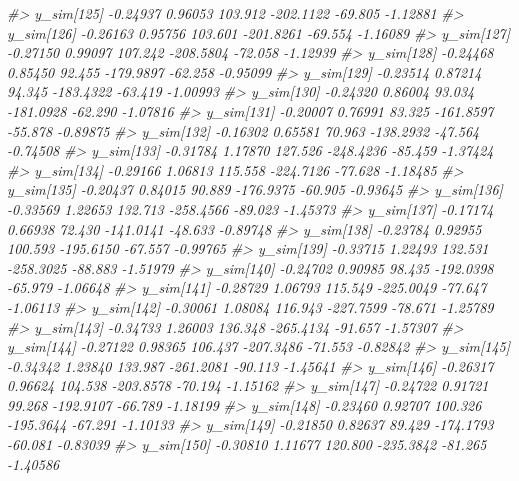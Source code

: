 \documentclass[
  10pt,
  italian,
  a4paper,
  extrafontsizes,onecolumn,openright
  ]{memoir}
\newenvironment{Shaded}{\begin{snugshade}}{\end{snugshade}}
\newcommand{\CommentTok}[1]{\textcolor[rgb]{0.56,0.35,0.01}{\textit{#1}}}
\begin{document}
\begin{Shaded}
\begin{Highlighting}[]
\CommentTok{\#\textgreater{} y\_sim[125] {-}0.24937 0.96053 103.912 {-}202.1122 {-}69.805 {-}1.12881}
\CommentTok{\#\textgreater{} y\_sim[126] {-}0.26163 0.95756 103.601 {-}201.8261 {-}69.554 {-}1.16089}
\CommentTok{\#\textgreater{} y\_sim[127] {-}0.27150 0.99097 107.242 {-}208.5804 {-}72.058 {-}1.12939}
\CommentTok{\#\textgreater{} y\_sim[128] {-}0.24468 0.85450  92.455 {-}179.9897 {-}62.258 {-}0.95099}
\CommentTok{\#\textgreater{} y\_sim[129] {-}0.23514 0.87214  94.345 {-}183.4322 {-}63.419 {-}1.00993}
\CommentTok{\#\textgreater{} y\_sim[130] {-}0.24320 0.86004  93.034 {-}181.0928 {-}62.290 {-}1.07816}
\CommentTok{\#\textgreater{} y\_sim[131] {-}0.20007 0.76991  83.325 {-}161.8597 {-}55.878 {-}0.89875}
\CommentTok{\#\textgreater{} y\_sim[132] {-}0.16302 0.65581  70.963 {-}138.2932 {-}47.564 {-}0.74508}
\CommentTok{\#\textgreater{} y\_sim[133] {-}0.31784 1.17870 127.526 {-}248.4236 {-}85.459 {-}1.37424}
\CommentTok{\#\textgreater{} y\_sim[134] {-}0.29166 1.06813 115.558 {-}224.7126 {-}77.628 {-}1.18485}
\CommentTok{\#\textgreater{} y\_sim[135] {-}0.20437 0.84015  90.889 {-}176.9375 {-}60.905 {-}0.93645}
\CommentTok{\#\textgreater{} y\_sim[136] {-}0.33569 1.22653 132.713 {-}258.4566 {-}89.023 {-}1.45373}
\CommentTok{\#\textgreater{} y\_sim[137] {-}0.17174 0.66938  72.430 {-}141.0141 {-}48.633 {-}0.89748}
\CommentTok{\#\textgreater{} y\_sim[138] {-}0.23784 0.92955 100.593 {-}195.6150 {-}67.557 {-}0.99765}
\CommentTok{\#\textgreater{} y\_sim[139] {-}0.33715 1.22493 132.531 {-}258.3025 {-}88.883 {-}1.51979}
\CommentTok{\#\textgreater{} y\_sim[140] {-}0.24702 0.90985  98.435 {-}192.0398 {-}65.979 {-}1.06648}
\CommentTok{\#\textgreater{} y\_sim[141] {-}0.28729 1.06793 115.549 {-}225.0049 {-}77.647 {-}1.06113}
\CommentTok{\#\textgreater{} y\_sim[142] {-}0.30061 1.08084 116.943 {-}227.7599 {-}78.671 {-}1.25789}
\CommentTok{\#\textgreater{} y\_sim[143] {-}0.34733 1.26003 136.348 {-}265.4134 {-}91.657 {-}1.57307}
\CommentTok{\#\textgreater{} y\_sim[144] {-}0.27122 0.98365 106.437 {-}207.3486 {-}71.553 {-}0.82842}
\CommentTok{\#\textgreater{} y\_sim[145] {-}0.34342 1.23840 133.987 {-}261.2081 {-}90.113 {-}1.45641}
\CommentTok{\#\textgreater{} y\_sim[146] {-}0.26317 0.96624 104.538 {-}203.8578 {-}70.194 {-}1.15162}
\CommentTok{\#\textgreater{} y\_sim[147] {-}0.24722 0.91721  99.268 {-}192.9107 {-}66.789 {-}1.18199}
\CommentTok{\#\textgreater{} y\_sim[148] {-}0.23460 0.92707 100.326 {-}195.3644 {-}67.291 {-}1.10133}
\CommentTok{\#\textgreater{} y\_sim[149] {-}0.21850 0.82637  89.429 {-}174.1793 {-}60.081 {-}0.83039}
\CommentTok{\#\textgreater{} y\_sim[150] {-}0.30810 1.11677 120.800 {-}235.3842 {-}81.265 {-}1.40586}

\end{Highlighting}
\end{Shaded}
\end{document}
